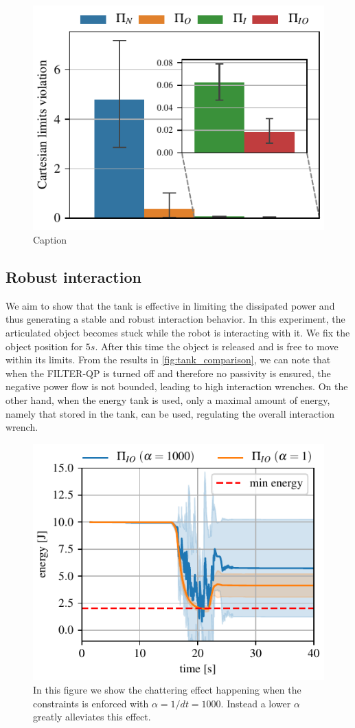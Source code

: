 \begin{figure}[t]
    \centering
    \includegraphics[width=0.7\columnwidth]{figures/obstacle_avoidance_test.pdf}
    \caption{Caption}
    \label{fig:tank_experiment}
\end{figure}

\subsection{Robust interaction}
We aim to show that the tank is effective in limiting the dissipated power and thus generating a stable and robust interaction behavior. In this experiment, the articulated object becomes stuck while the robot is interacting with it. We fix the object position for $5s$. After this time the object is released and is free to move within its limits. From the results in \fig\ref{fig:tank_comparison}, we can note that when the FILTER-QP is turned off and therefore no passivity is ensured, the negative power flow is not bounded, leading to high interaction wrenches. On the other hand, when the energy tank is used, only a maximal amount of energy, namely that stored in the tank, can be used, regulating the overall interaction wrench.

\begin{figure}[t]
\centering
\includegraphics[width=0.8\columnwidth]{figures/fix_experiment/passivity_coefficient_comparison.pdf}
\caption{In this figure we show the chattering effect happening when the constraints is enforced with $\alpha = 1/dt = 1000$. Instead a lower $\alpha$ greatly alleviates this effect.  }\label{fig:tank_as_zbf}
\end{figure}


